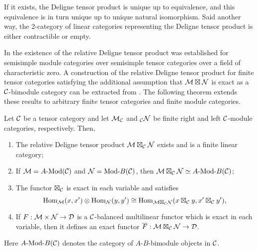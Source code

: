 \documentclass{amsart}
\begin{document}
If it exists, the Deligne tensor product is unique up to equivalence, and this equivalence is in turn unique up to unique natural isomorphism. Said another way, the 2-category of linear categories representing the Deligne tensor product is either contractible or empty. 

In \cite{0909.3140} the existence of the relative Deligne tensor product was established for semisimple module categories over semisimple tensor categories over a field of characteristic zero.  A construction of the relative Deligne tensor product for finite tensor categories satisfying the additional assumption that $\mathcal M \boxtimes \mathcal N$ is exact as a $\mathcal C$-bimodule category can be extracted from \cite[Thm 3.1]{1102.3411}. The following theorem extends these results to arbitrary finite tensor categories and finite module categories. 

\begin{theorem} \label{thm:DelignePrdtOverATCExists}
	Let $\mathcal C$ be a tensor category and let $\mathcal M_{\mathcal C}$ and ${}_{\mathcal C}\mathcal N$ be finite right and left $\mathcal C$-module categories, respectively. Then,
	\begin{enumerate}
		\item The relative Deligne tensor product $\mathcal M \boxtimes_{\mathcal C} \mathcal N$ exists and is a finite linear category;
		\item If $\cM = \Mod{A}{}(\cC)$ and $\cN = \Mod{}{B}(\cC)$, then $\cM \boxtimes_{\cC} \cN \simeq \Mod{A }{B}(\cC)$;

		\item The functor $\boxtimes_{\mathcal C}$ is exact in each variable and satisfies 
		\begin{equation*}
			\operatorname{Hom}_{\mathcal M}(x,x') \otimes \operatorname{Hom}_{\mathcal N}(y, y') \cong \operatorname{Hom}_{\mathcal M \boxtimes_{\mathcal C} \mathcal N} (x \boxtimes_{\mathcal C} y, x' \boxtimes_{\mathcal C} y'),
		\end{equation*}
		\item If $F: \mathcal M \times \mathcal N \to \mathcal D$ is a $\mathcal C$-balanced multilinear functor which is exact in each variable, then it defines an exact functor $\overline{F}: \mathcal M \boxtimes_{\mathcal C} \mathcal N \to \mathcal D$. 
	\end{enumerate} 
\nid Here $\Mod{A}{B}(\cC)$ denotes the category of $A$-$B$-bimodule objects in $\mathcal C$.	
\end{theorem}
\end{document}
